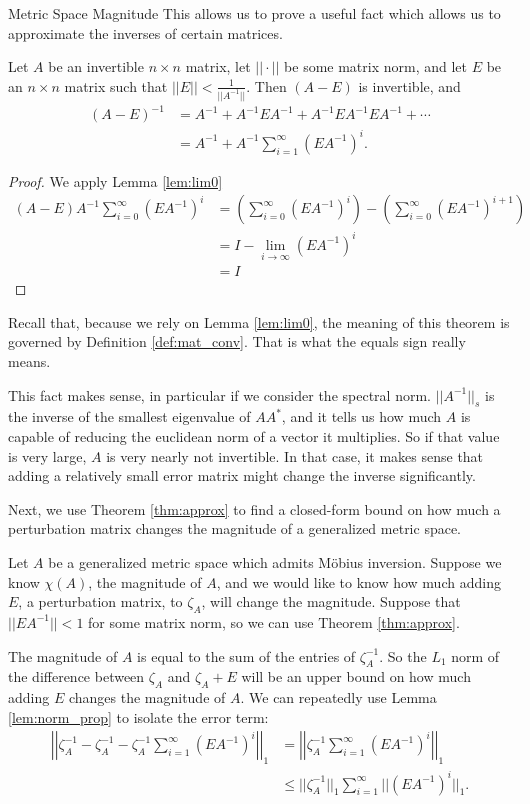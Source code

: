 \documentclass[12pt]{pom_thesis}
\begin{document}
\begin{chapter}{Metric Space Magnitude}
This allows us to prove a useful fact which allows us to approximate the inverses of certain matrices.
\begin{thm}\label{thm:approx}
Let $A$ be an invertible $n \times n$ matrix, let $||\cdot||$ be some matrix norm, and let $E$ be an $n \times n$ matrix such that $||E|| < \frac 1{||A^{-1}||}$. Then $(A-E)$ is invertible, and
\begin{align*}
(A - E)^{-1} &= A^{-1} + A^{-1}EA^{-1} + A^{-1}EA^{-1}EA^{-1} + \cdots\\
&= A^{-1} + A^{-1}\sum_{i = 1}^\infty (EA^{-1})^i.
\end{align*}
\end{thm}
\begin{proof}
We apply Lemma \ref{lem:lim0}
\begin{align*}
(A-E)  A^{-1}\sum_{i = 0}^\infty (EA^{-1})^i
&= \left(\sum_{i = 0}^\infty (EA^{-1})^i\right) - \left( \sum_{i = 0}^\infty (EA^{-1})^{i+1}\right)\\
&= I - \lim_{i \rightarrow \infty} (EA^{-1})^i\\
&= I
\end{align*}
\end{proof}
\begin{rmk}
Recall that, because we rely on Lemma \ref{lem:lim0}, the meaning of this theorem is governed by Definition \ref{def:mat_conv}. That is what the equals sign really means. 
\end{rmk}
This fact makes sense, in particular if we consider the spectral norm. $||A^{-1}||_s$ is the inverse of the smallest eigenvalue of $AA^*$, and it tells us how much $A$ is capable of reducing the euclidean norm of a vector it multiplies. So if that value is very large, $A$ is very nearly not invertible. In that case, it makes sense that adding a relatively small error matrix might change the inverse significantly. 

Next, we use Theorem \ref{thm:approx} to find a closed-form bound on how much a perturbation matrix changes the magnitude of a generalized metric space.

Let $A$ be a generalized metric space which admits M\"obius inversion. Suppose we know $\chi(A)$, the magnitude of $A$, and we would like to know how much adding $E$, a perturbation matrix, to $\zeta_A$, will change the magnitude. Suppose that $||EA^{-1}|| < 1$ for some matrix norm, so we can use Theorem \ref{thm:approx}.

The magnitude of $A$ is equal to the sum of the entries of $\zeta_A^{-1}$. So the $L_1$ norm of the difference between $\zeta_A$ and $\zeta_A + E$ will be an upper bound on how much adding $E$ changes the magnitude of $A$. We can repeatedly use Lemma \ref{lem:norm_prop} to isolate the error term:
\begin{align}
\left|\left|\zeta_A^{-1} - \zeta_A^{-1} - \zeta_A^{-1}\sum_{i = 1}^\infty (EA^{-1})^i\right|\right|_1 \nonumber 
&= \left|\left|\zeta_A^{-1}\sum_{i = 1}^\infty (EA^{-1})^i\right|\right|_1 \nonumber \\
&\leq ||\zeta_A^{-1}||_1\sum_{i = 1}^\infty ||(EA^{-1})^i||_1. \label{eq:series}
\end{align}


\end{chapter}
\end{document}
